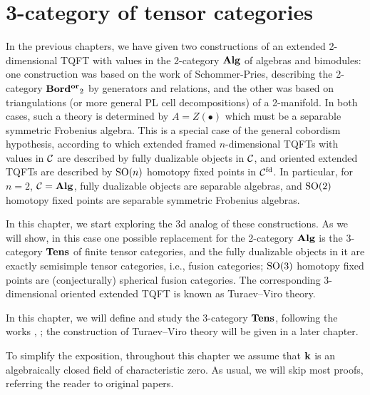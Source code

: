 \chapter{3-category of tensor categories}\label{c:3cat-tens}

In the previous chapters, we have given two constructions of an extended
2-dimensional TQFT with values in the 2-category $\mathbf{Alg}$ of algebras and
bimodules: one construction was based on the work of Schommer-Pries, describing
the 2-category $\mathbf{Bord^{or}}_2$ by generators and relations, and the other was based
on triangulations (or more general PL cell decompositions) of a 2-manifold. In
both cases, such a theory is determined by $A=Z(\bullet)$ which must be a
separable symmetric Frobenius algebra. This is a special case of the general
cobordism hypothesis, according to which extended framed $n$-dimensional TQFTs
with values in $\mathcal{C}$ are described by fully dualizable objects in $\mathcal{C}$, and
oriented extended TQFTs are described by $\mathrm{SO}(n)$ homotopy fixed points in
$\mathcal{C}^{{\mathrm{fd}}}$. In particular, for $n=2$, $\mathcal{C}=\mathbf{Alg}$, fully dualizable objects
are separable algebras, and $\mathrm{SO}(2)$ homotopy fixed points are
separable symmetric Frobenius algebras.

In this chapter, we start exploring the 3d analog of these constructions. As we
will show, in this case one possible replacement for the 2-category $\mathbf{Alg}$ is
the 3-category $\mathbf{Tens}$ of finite tensor categories, and the fully dualizable
objects in it are exactly semisimple tensor categories, i.e., fusion categories;
$\mathrm{SO}(3)$ homotopy fixed points are (conjecturally) spherical fusion categories.
The corresponding 3-dimensional oriented extended TQFT is known as Turaev--Viro
theory.

In this chapter, we will define and study the 3-category $\mathbf{Tens}$, following
the works , ; the construction of
Turaev--Viro theory will be given in a later chapter.

To simplify the exposition, throughout this chapter we assume that $\mathbf{k}$ is an
algebraically closed field of characteristic zero. As usual, we will skip most
proofs, referring the reader to original papers.

